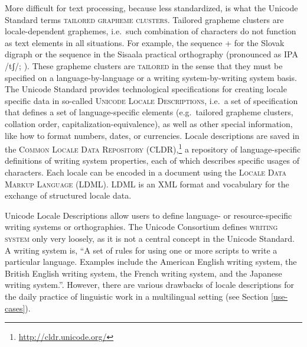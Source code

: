 More difficult for text processing, because less standardized, is what the
Unicode Standard terms \textsc{tailored grapheme clusters}. Tailored grapheme
clusters are locale-dependent graphemes, i.e.~such combination of characters do
not function as text elements in all situations. For example, the sequence + for
the Slovak digraph or the sequence in the Sisaala practical orthography
(pronounced as IPA /tʃ/; \cite{Moran2006}). These grapheme clusters are
\textsc{tailored} in the sense that they must be specified on a
language-by-language or a writing system-by-writing system basis. The Unicode
Standard provides technological specifications for creating locale specific data
in so-called \textsc{Unicode Locale Descriptions}, i.e.~a set of specification
that defines a set of language-specific elements (e.g.~tailored grapheme
clusters, collation order, capitalization-equivalence), as well as other special
information, like how to format numbers, dates, or currencies. Locale
descriptions are saved in the \textsc{Common Locale Data Repository
(CLDR)},\footnote{\url{http://cldr.unicode.org/}} a repository of
language-specific definitions of writing system properties, each of which
describes specific usages of characters. Each locale can be encoded in a
document using the \textsc{Locale Data Markup Language (LDML)}. LDML is an XML
format and vocabulary for the exchange of structured locale data.

Unicode Locale Descriptions allow users to define language- or resource-specific
writing systems or orthographies. The Unicode Consortium defines \textsc{writing
system} only very loosely, as it is not a central concept in the Unicode
Standard. A writing system is, ``A set of rules for using one or more scripts to
write a particular language. Examples include the American English writing
system, the British English writing system, the French writing system, and the
Japanese writing system.''. However, there are various drawbacks of locale
descriptions for the daily practice of linguistic work in a multilingual setting
(see Section \ref{use-cases}).
